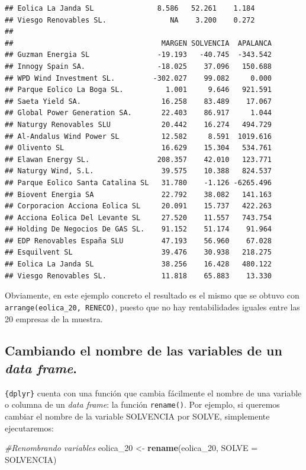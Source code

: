 \documentclass[
]{book}
\newenvironment{Shaded}{\begin{snugshade}}{\end{snugshade}}
\newcommand{\AttributeTok}[1]{\textcolor[rgb]{0.13,0.29,0.53}{#1}}
\newcommand{\CommentTok}[1]{\textcolor[rgb]{0.56,0.35,0.01}{\textit{#1}}}
\newcommand{\FunctionTok}[1]{\textcolor[rgb]{0.13,0.29,0.53}{\textbf{#1}}}
\newcommand{\NormalTok}[1]{#1}
\newcommand{\OtherTok}[1]{\textcolor[rgb]{0.56,0.35,0.01}{#1}}
\begin{document}
\begin{verbatim}
## Eolica La Janda SL               8.586   52.261    1.184
## Viesgo Renovables SL.               NA    3.200    0.272
## 
##                                   MARGEN SOLVENCIA  APALANCA
## Guzman Energia SL                -19.193   -40.745  -343.542
## Innogy Spain SA.                 -18.025    37.096   150.688
## WPD Wind Investment SL.         -302.027    99.082     0.000
## Parque Eolico La Boga SL.          1.001     9.646   921.591
## Saeta Yield SA.                   16.258    83.489    17.067
## Global Power Generation SA.       22.403    86.917     1.044
## Naturgy Renovables SLU            20.442    16.274   494.729
## Al-Andalus Wind Power SL          12.582     8.591  1019.616
## Olivento SL                       16.629    15.304   534.761
## Elawan Energy SL.                208.357    42.010   123.771
## Naturgy Wind, S.L.                39.575    10.388   824.537
## Parque Eolico Santa Catalina SL   31.780    -1.126 -6265.496
## Biovent Energia SA                22.792    38.082   141.163
## Corporacion Acciona Eolica SL     20.091    15.737   422.263
## Acciona Eolica Del Levante SL     27.520    11.557   743.754
## Holding De Negocios De GAS SL.    91.152    51.174    91.964
## EDP Renovables España SLU         47.193    56.960    67.028
## Esquilvent SL                     39.476    30.938   218.275
## Eolica La Janda SL                38.256    16.428   480.122
## Viesgo Renovables SL.             11.818    65.883    13.330
\end{verbatim}

Obviamente, en este ejemplo concreto el resultado es el mismo que se obtuvo con \texttt{arrange(eolica\_20,\ RENECO)}, puesto que no hay rentabilidades iguales entre las 20 empresas de la muestra.

\subsection{\texorpdfstring{Cambiando el nombre de las variables de un \emph{data frame}.}{Cambiando el nombre de las variables de un data frame.}}\label{cambiando-el-nombre-de-las-variables-de-un-data-frame.}

\texttt{\{dplyr\}} cuenta con una función que cambia fácilmente el nombre de una variable o columna de un \emph{data frame}: la función \texttt{rename()}. Por ejemplo, si queremos cambiar el nombre de la variable SOLVENCIA por SOLVE, simplemente ejecutaremos:

\begin{Shaded}
\begin{Highlighting}[]
\CommentTok{\#Renombrando variables}
\NormalTok{eolica\_20 }\OtherTok{\textless{}{-}} \FunctionTok{rename}\NormalTok{(eolica\_20, }\AttributeTok{SOLVE =}\NormalTok{ SOLVENCIA)}
\end{Highlighting}
\end{Shaded}
\end{document}
